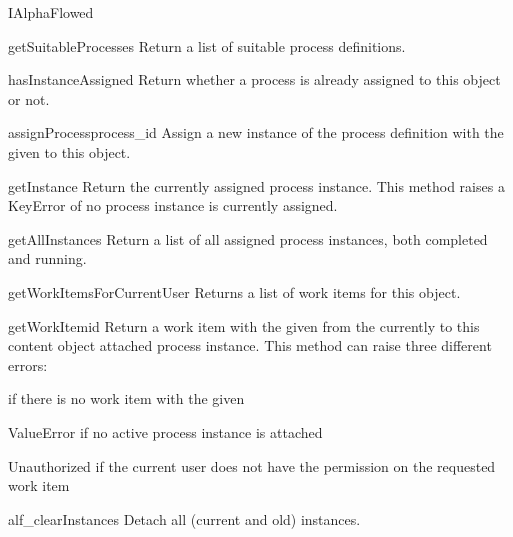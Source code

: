 
    \begin{classdesc}{IAlphaFlowed}{}
        
      \begin{funcdesc}{getSuitableProcesses}{}
        Return a list of suitable process definitions.
      \end{funcdesc}

      \begin{funcdesc}{hasInstanceAssigned}{}
        Return whether a process is already assigned to this object or not.
      \end{funcdesc}

      \begin{funcdesc}{assignProcess}{process_id}
        Assign a new instance of the process definition with the given 
         to this object.
      \end{funcdesc}

      \begin{funcdesc}{getInstance}{}
        Return the currently assigned process instance. This method 
        raises a KeyError of no process instance is currently assigned.
      \end{funcdesc}

      \begin{funcdesc}{getAllInstances}{}
        Return a list of all assigned process instances, both completed 
        and running.
      \end{funcdesc}

      \begin{funcdesc}{getWorkItemsForCurrentUser}{}
        Returns a list of work items for this object.
      \end{funcdesc}

      \begin{funcdesc}{getWorkItem}{id}
        Return a work item with the given  from the currently 
        to this content object attached process instance. This method 
        can raise three different errors:
        \begin{description}
          \item[AttributeError] if there is no work item with the given 
          \item{ValueError} if no active process instance is attached
          \item{Unauthorized} if the current user does not have the 
           permission on the requested work item
        \end{description}
      \end{funcdesc}

      \begin{funcdesc}{alf_clearInstances}{}
        Detach all (current and old) instances.
      \end{funcdesc}
      
    \end{classdesc}
    
